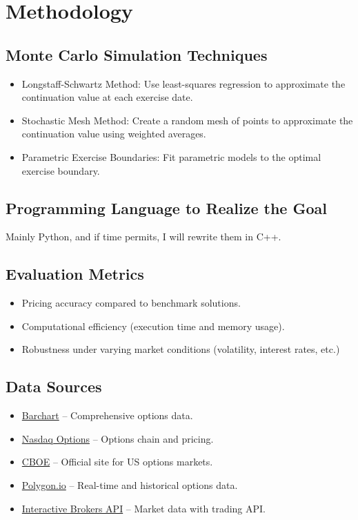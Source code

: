 \documentclass[margin=1in]{article}
\begin{document}
		\section*{Methodology}
		 \subsection*{Monte Carlo Simulation Techniques}
		 
		 \begin{itemize}
		 	\item Longstaff-Schwartz Method: Use least-squares regression to approximate the continuation value at each exercise date.
		 
		 \item Stochastic Mesh Method: Create a random mesh of points to approximate the continuation value using weighted averages.
		 
		 \item Parametric Exercise Boundaries: Fit parametric models to the optimal exercise boundary.
		\end{itemize}
	
	 \subsection*{Programming Language to Realize the Goal}
	 Mainly Python, and if time permits, I will rewrite them in C++.
	 
	 \subsection*{Evaluation Metrics}
	 
	 \begin{itemize}
	 \item Pricing accuracy compared to benchmark solutions.
	 
	\item Computational efficiency (execution time and memory usage).
	 
	 \item Robustness under varying market conditions (volatility, interest rates, etc.)
	\end{itemize}

\subsection*{Data Sources}
\begin{itemize}
	\item \href{https://www.barchart.com/}{Barchart} – Comprehensive options data.
	\item \href{https://www.nasdaq.com/market-activity/quotes/options}{Nasdaq Options} – Options chain and pricing.
	\item \href{https://www.cboe.com/}{CBOE} – Official site for US options markets.
	\item \href{https://polygon.io/}{Polygon.io} – Real-time and historical options data.
	\item \href{https://www.interactivebrokers.com/en/trading/api.php}{Interactive Brokers API} – Market data with trading API.
\end{itemize}
	
\end{document}
